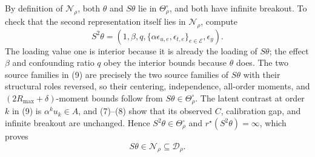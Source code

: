 By definition of \(\mathcal N_\rho\), both \(\theta\) and \(S\theta\) lie in \(\Theta_\rho^\circ\), and both have infinite breakout.  To check that the second representation itself lies in \(\mathcal N_\rho\), compute
\[
 S^2\theta
 =\left(1,\beta,q,
   \{\alpha\epsilon_{u,e},\epsilon_{t,e}\}_{e\in\mathcal E},\epsilon_y\right).       \tag{9}
\]
The loading value one is interior because it is already the loading of \(S\theta\); the effect \(\beta\) and confounding ratio \(q\) obey the interior bounds because \(\theta\) does.  The two source families in (9) are precisely the two source families of \(S\theta\) with their structural roles reversed, so their centering, independence, all-order moments, and \((2R_{\max}+\delta)\)-moment bounds follow from \(S\theta\in\Theta_\rho^\circ\).  The latent contrast at order \(k\) in (9) is \(\alpha^ku_k\in A\), and (7)--(8) show that its observed \(C\), calibration gap, and infinite breakout are unchanged.  Hence \(S^2\theta\in\Theta_\rho^\circ\) and \(r^\star(S^2\theta)=\infty\), which proves
\[
 S\theta\in\mathcal N_\rho\subseteq\mathcal D_\rho.
\]

